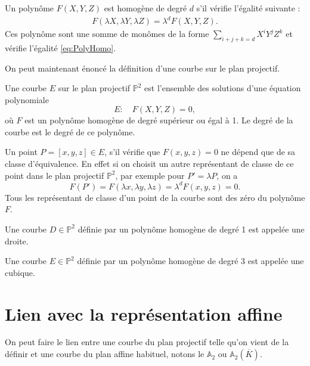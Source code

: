 \begin{definition}
    \label{polyHomo}
    
    Un polynôme $F(X,Y,Z)$ est homogène de degré $d$ s'il vérifie l'égalité suivante :
    \begin{align}
        \label{eq:polyHomo}
    F(\lambda X, \lambda Y, \lambda Z) = \lambda^{d}F(X,Y,Z)
    .\end{align}
    Ces polynôme sont une somme de monômes de la forme $\sum_{i+j+k=d} X^{i}Y^{j}Z^{k}$
    et vérifie l'égalité \eqref{eq:PolyHomo}.
\end{definition}

On peut maintenant énoncé la définition d'une courbe sur le plan projectif.

\begin{definition}
    \label{def:courbeP2}
    Une courbe $E$ sur le plan projectif $\mathbb{P}^2$ est l'ensemble des solutions d'une
    équation polynomiale 
    \[
    E : \quad F(X,Y,Z)=0
    ,\] 
    où $F$ est un polynôme homogène de degré supérieur ou égal à 1. Le degré de la courbe
    est le degré de ce polynôme.
\end{definition}

Un point $P = [x,y,z] \in E$, s'il vérifie que $F(x,y,z)=0$ ne dépend que de sa classe
d'équivalence. En effet si on choisit un autre
représentant de classe de ce point dans le plan projectif $\mathbb{P}^2$, par exemple pour
$P'=\lambda P$, on a
\[
F(P')=F(\lambda x, \lambda y, \lambda z) = \lambda^{d}F(x,y,z) = 0
.\] 
Tous les représentant de classe d'un point de la courbe sont des zéro du polynôme $F$.

\begin{definition}
    \label{def:cubique}
    
    Une courbe $D \in \mathbb{P}^2$ définie par un polynôme homogène de degré 1 est appelée
    une droite.

    Une courbe $E \in \mathbb{P}^2$ définie par un polynôme homogène de degré $3$ est appelée
    une cubique.
\end{definition}

\section{Lien avec la représentation affine}
On peut faire le lien entre une courbe du plan projectif telle qu'on vient de la définir
et une courbe du plan affine habituel, notons le $\mathbb{A}_{2}$ ou
$\mathbb{A}_{2}(\overline{K})$. 

